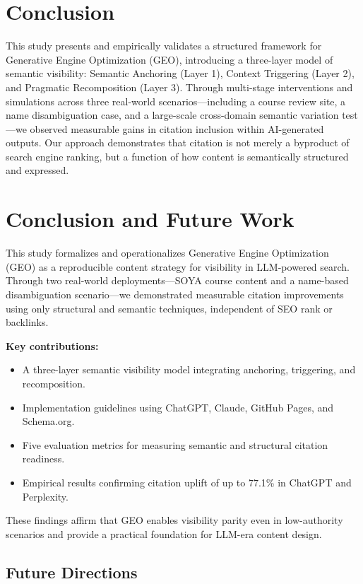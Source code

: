 \section{Conclusion}

This study presents and empirically validates a structured framework for Generative Engine Optimization (GEO), introducing a three-layer model of semantic visibility: Semantic Anchoring (Layer 1), Context Triggering (Layer 2), and Pragmatic Recomposition (Layer 3). Through multi-stage interventions and simulations across three real-world scenarios—including a course review site, a name disambiguation case, and a large-scale cross-domain semantic variation test—we observed measurable gains in citation inclusion within AI-generated outputs. Our approach demonstrates that citation is not merely a byproduct of search engine ranking, but a function of how content is semantically structured and expressed.


\section{Conclusion and Future Work}

This study formalizes and operationalizes Generative Engine Optimization (GEO) as a reproducible content strategy for visibility in LLM-powered search. Through two real-world deployments---SOYA course content and a name-based disambiguation scenario---we demonstrated measurable citation improvements using only structural and semantic techniques, independent of SEO rank or backlinks.

\textbf{Key contributions:}
\begin{itemize}
  \item A three-layer semantic visibility model integrating anchoring, triggering, and recomposition.
  \item Implementation guidelines using ChatGPT, Claude, GitHub Pages, and Schema.org.
  \item Five evaluation metrics for measuring semantic and structural citation readiness.
  \item Empirical results confirming citation uplift of up to 77.1\% in ChatGPT and Perplexity.
\end{itemize}

These findings affirm that GEO enables visibility parity even in low-authority scenarios and provide a practical foundation for LLM-era content design.

\subsection{Future Directions}

